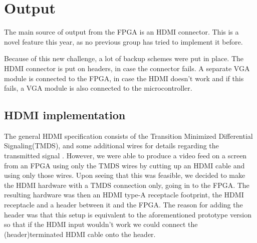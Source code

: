 \documentclass[../main/report.tex]{subfiles}
\begin{document}
\section{Output}
The main source of output from the FPGA is an HDMI connector.
This is a novel feature this year, as no previous group has tried to implement it before.

Because of this new challenge, a lot of backup schemes were put in place.
The HDMI connector is put on headers, in case the connector fails.
A separate VGA module is connected to the FPGA, in case the HDMI doesn't work and if this fails, a VGA module is also connected to the microcontroller.

\subsection{HDMI implementation}

The general HDMI specification consists of the Transition Minimized Differential Signaling(TMDS), and some additional wires for details regarding the transmitted signal \cite{hdmi-pinout}.
However, we were able to produce a video feed on a screen from an FPGA using only the TMDS wires by cutting up an HDMI cable and using only those wires.
Upon seeing that this was feasible, we decided to make the HDMI hardware with a TMDS connection only, going in to the FPGA. The resulting hardware was then an HDMI type-A receptacle footprint, the HDMI receptacle and a header between it and the FPGA.
The reason for adding the header was that this setup is equivalent to the aforementioned prototype version so that if the HDMI input wouldn't work we could connect the (header)terminated HDMI cable onto the header.

\end{document}
